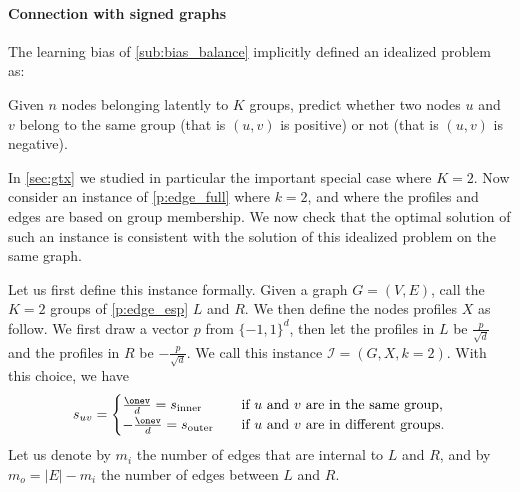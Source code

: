 \paragraph{Connection with signed graphs}
\label{par:generalization_of_signed_graphs}

The learning bias of \autoref{sub:bias_balance} implicitly defined an idealized \esp{} problem as:
\begin{problem}
  \label{p:edge_esp}
  Given $n$ nodes belonging latently to $K$ groups, predict whether two nodes $u$ and $v$ belong to
  the same group (that is $(u,v)$ is positive) or not (that is $(u,v)$ is negative).
\end{problem}
In \autoref{sec:gtx} we studied in particular the important special case where $K=2$. Now consider an
instance of \autoref{p:edge_full} where $k=2$, and where the profiles and edges are based on group
membership. We now check that the optimal solution of such an instance is consistent with the
solution of this idealized \esp{} problem on the same graph.

Let us first define this instance formally. Given a graph $G=(V,E)$, call the $K=2$ groups of
\autoref{p:edge_esp} $L$ and $R$. We then define the nodes profiles $X$ as follow. We first draw \uar{} a vector $p$
from $\{-1, 1\}^d$, then let the profiles in $L$ be $\frac{p}{\sqrt{d}}$ and the
profiles in $R$ be $-\frac{p}{\sqrt{d}}$. We call this instance $\mathcal{I} = (G, X, k=2)$. With
this choice, we have
\begin{equation*}
  s_{uv} =
  \begin{cases}
    \frac{\onev}{d} = s_{\mathrm{inner}} & \quad \text{if $u$ and $v$ are in the same group,} \\
    -\frac{\onev}{d} = s_{\mathrm{outer}} & \quad \text{if $u$ and $v$ are in different groups.}
  \end{cases}
\end{equation*}
Let us denote by $m_i$ the number of edges that are internal to $L$ and $R$, and by $m_o = |E| -
m_i$ the number of edges between $L$ and $R$.

